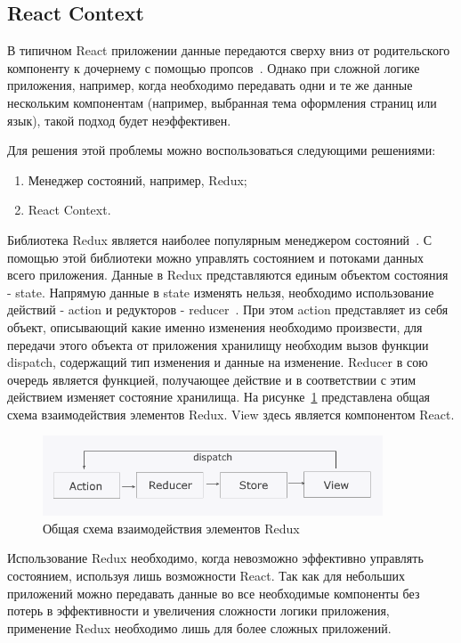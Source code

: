 \subsection{React Context}

В типичном React приложении данные передаются сверху вниз от родительского компоненту к дочернему с помощью пропсов~\cite{react}. Однако при сложной логике приложения, например, когда необходимо передавать одни и те же данные нескольким компонентам (например, выбранная тема оформления страниц или язык), такой подход будет неэффективен.

Для решения этой проблемы можно воспользоваться следующими решениями:

\begin{enumerate}
  \item Менеджер состояний, например, Redux;
  \item React Context.
\end{enumerate}

Библиотека Redux является наиболее популярным менеджером состояний~\cite{redux}. С помощью этой библиотеки можно управлять состоянием и потоками данных всего приложения. Данные в Redux представляются единым объектом состояния - state. Напрямую данные в state изменять нельзя, необходимо использование действий - action и редукторов - reducer~\cite{redux}. При этом action представляет из себя объект, описывающий какие именно изменения необходимо произвести, для передачи этого объекта от приложения хранилищу необходим вызов функции dispatch, содержащий тип изменения и данные на изменение. Reducer в сою очередь является функцией, получающее действие и в соответствии с этим действием изменяет состояние хранилища. На рисунке~\ref{img:react__redux} представлена общая схема взаимодействия элементов Redux. View здесь является компонентом React.

\begin{figure}[H]
  \centering
  \includegraphics[width=0.9\textwidth]{assets/images/theoretical2/redux.png}
  \caption{Общая схема взаимодействия элементов Redux}
  \label{img:react__redux}
\end{figure}

Использование Redux необходимо, когда невозможно эффективно управлять состоянием, используя лишь возможности React. Так как для небольших приложений можно передавать данные во все необходимые компоненты без потерь в эффективности и увеличения сложности логики приложения, применение Redux необходимо лишь для более сложных приложений.

